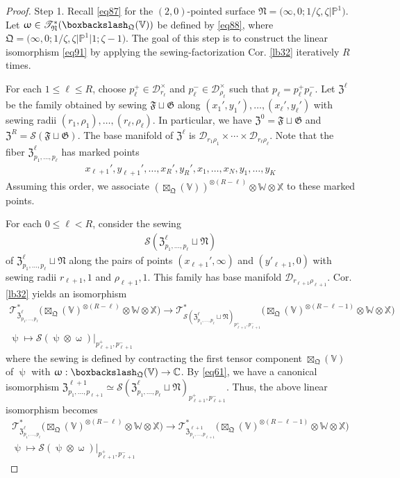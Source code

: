 \documentclass[11pt,b5paper,notitlepage]{article}
\theoremstyle{definition}
\theoremstyle{plain}
\newcommand{\Vbb}{\mathbb V}
\newcommand{\Xbb}{\mathbb X}
\newcommand{\Wbb}{\mathbb W}
\newcommand{\Cbb}{\mathbb C}
\newcommand{\Pbb}{\mathbb P}
\newcommand{\<}{\left\langle}
\renewcommand{\>}{\right\rangle}
\newcommand{\ST}{\mathscr{T}}
\newcommand{\MD}{\mathcal{D}}
\newcommand{\MS}{\mathcal{S}}
\newcommand{\bbs}{\boxbackslash}
\newcommand{\fq}{{\mathfrak Q}}
\newcommand{\fn}{\mathfrak{N}}
\newcommand{\ff}{\mathfrak{F}}
\newcommand{\fg}{\mathfrak{G}}
\newcommand{\fz}{\mathfrak{Z}}
\numberwithin{equation}{section}
\begin{document}
\begin{proof}
Step 1. Recall \eqref{eq87} for the $(2,0)$-pointed surface $\fn=\big(\infty,0;1/\zeta,\zeta\big|\Pbb^1\big)$. Let $\upomega\in\ST^*_\fn(\bbs_\fq(\Vbb))$ be defined by \eqref{eq88}, where $\fq=\big(\infty,0;1/\zeta,\zeta\big|\Pbb^1\big|1;\zeta-1\big)$. The goal of this step is to construct  the linear isomorphism \eqref{eq91} by applying the sewing-factorization Cor. \ref{lb32} iteratively $R$ times.


For each $1\leq \ell\leq R$, choose $p^+_\ell\in\MD^\times_{r_\ell}$ and $p^-_\ell\in\MD^\times_{\rho_\ell}$ such that $p_\ell=p^+_\ell p^-_\ell$. Let $\fz^\ell$ be the family obtained by sewing $\ff\sqcup\fg$ along $(x_1',y_1'),\dots,(x_\ell',y_\ell')$ with sewing radii $(r_1,\rho_1),\dots,(r_\ell,\rho_\ell)$. In particular, we have $\fz^0=\ff\sqcup\fg$ and $\fz^R=\MS(\ff\sqcup\fg)$. The base manifold of $\fz^\ell$ is $\MD_{r_1\rho_1}\times\cdots\times\MD_{r_\ell\rho_\ell}$. Note that the fiber $\fz^\ell_{p_1,\dots,p_\ell}$ has marked points
\begin{align*}
x_{\ell+1}',y_{\ell+1}',\dots,x_R',y_R',x_1,\dots,x_N,y_1,\dots,y_K
\end{align*}
Assuming this order, we associate $(\boxtimes_\fq(\Vbb))^{\otimes(R-\ell)}\otimes\Wbb\otimes\Xbb$ to these marked points. 



For each $0\leq\ell<R$, consider the sewing
\begin{align*}
\MS(\fz^\ell_{p_1,\dots,p_\ell}\sqcup\fn)
\end{align*}
of $\fz^\ell_{p_1,\dots,p_\ell}\sqcup\fn$ along the pairs of points $(x_{\ell+1}',\infty)$ and $(y'_{\ell+1},0)$ with sewing radii $r_{\ell+1},1$ and $\rho_{\ell+1},1$. This family has base manifold $\MD_{r_{\ell+1}\rho_{\ell+1}}$.  Cor. \ref{lb32} yields an isomorphism
\begin{gather*}
\ST^*_{\fz^\ell_{p_1,\dots,p_\ell}}\big(\boxtimes_\fq(\Vbb)^{\otimes(R-\ell)}\otimes\Wbb\otimes\Xbb\big)\rightarrow \ST^*_{\MS(\fz^\ell_{p_1,\dots,p_\ell}\sqcup\fn)_{p^+_{\ell+1},p^-_{\ell+1}}}\big(\boxtimes_\fq(\Vbb)^{\otimes(R-\ell-1)}\otimes\Wbb\otimes\Xbb\big)\\
\uppsi\mapsto \MS(\uppsi\otimes\upomega)\big|_{p^+_{\ell+1},p^-_{\ell+1}}
\end{gather*}
where the sewing is defined by contracting the first tensor component $\boxtimes_\fq(\Vbb)$ of $\uppsi$ with $\upomega:\bbs_\fq(\Vbb)\rightarrow\Cbb$. By \eqref{eq61}, we have a canonical isomorphism $\fz^{\ell+1}_{p_1,\dots,p_{\ell+1}}\simeq\MS(\fz^\ell_{p_1,\dots,p_\ell}\sqcup\fn)_{p^+_{\ell+1},p^-_{\ell+1}}$. Thus, the above linear isomorphism becomes
\begin{gather*}
\ST^*_{\fz^\ell_{p_1,\dots,p_\ell}}\big(\boxtimes_\fq(\Vbb)^{\otimes(R-\ell)}\otimes\Wbb\otimes\Xbb\big)\longrightarrow \ST^*_{\fz^{\ell+1}_{p_1,\dots,p_{\ell+1}}}\big(\boxtimes_\fq(\Vbb)^{\otimes(R-\ell-1)}\otimes\Wbb\otimes\Xbb\big)\\
\uppsi\mapsto \MS(\uppsi\otimes\upomega)\big|_{p^+_{\ell+1},p^-_{\ell+1}}
\end{gather*}



\end{proof}
\end{document}
